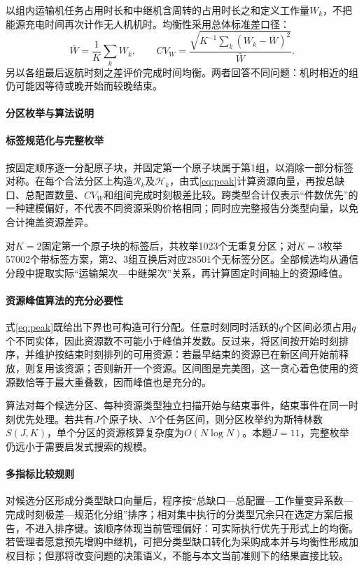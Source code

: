 以组内运输机任务占用时长和中继机含周转的占用时长之和定义工作量$W_k$，不把能源充电时间再次计作无人机机时。均衡性采用总体标准差口径：
\begin{equation}
\bar W=\frac1K\sum_kW_k,\qquad
CV_W=\frac{\sqrt{K^{-1}\sum_k(W_k-\bar W)^2}}{\bar W}.
\end{equation}
另以各组最后返航时刻之差评价完成时间均衡。两者回答不同问题：机时相近的组仍可能因等待或晚开始而较晚结束。

\paragraph{分区枚举与算法说明}
\paragraph{标签规范化与完整枚举}
按固定顺序逐一分配原子块，并固定第一个原子块属于第1组，以消除一部分标签对称。在每个合法分区上构造$\mathcal R_k$及$\mathcal H_k$，由式\eqref{eq:peak}计算资源向量，再按总缺口、总配置数量、$CV_W$和组间完成时刻极差比较。跨类型合计仅表示“件数优先”的一种建模偏好，不代表不同资源采购价格相同；同时应完整报告分类型向量，以免合计掩盖资源差异。

对$K=2$固定第一个原子块的标签后，共枚举1023个无重复分区；对$K=3$枚举57002个带标签方案，第2、3组互换后对应28501个无标签分区。全部候选均从通信分段中提取实际“运输架次---中继架次”关系，再计算固定时间轴上的资源峰值。

\paragraph{资源峰值算法的充分必要性}
式\eqref{eq:peak}既给出下界也可构造可行分配。任意时刻同时活跃的$q$个区间必须占用$q$个不同实体，因此资源数不可能小于峰值并发数。反过来，将区间按开始时刻排序，并维护按结束时刻排列的可用资源：若最早结束的资源已在新区间开始前释放，则复用该资源；否则新开一个资源。区间图是完美图，这一贪心着色使用的资源数恰等于最大重叠数，因而峰值也是充分的。

算法对每个候选分区、每种资源类型独立扫描开始与结束事件，结束事件在同一时刻优先处理。若共有$J$个原子块、$N$个任务区间，则分区枚举约为斯特林数$S(J,K)$，单个分区的资源核算复杂度为$O(N\log N)$。本题$J=11$，完整枚举仍远小于需要启发式搜索的规模。

\paragraph{多指标比较规则}
对候选分区形成分类型缺口向量后，程序按“总缺口—总配置—工作量变异系数—完成时刻极差—规范化分组”排序；相对集中执行的分类型冗余只在选定方案后报告，不进入排序键。该顺序体现当前管理偏好：可实际执行优先于形式上的均衡。若管理者愿意预先增购中继机，可把分类型缺口转化为采购成本并与均衡性形成加权目标；但那将改变问题的决策语义，不能与本文当前准则下的结果直接比较。

